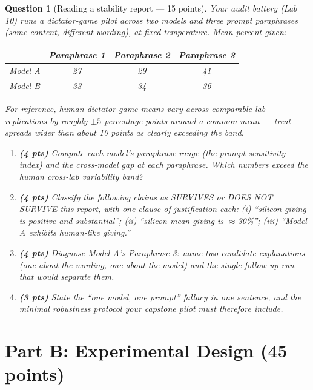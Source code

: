 \documentclass[11pt]{article}
\newtheorem{question}{Question}
\begin{document}
\begin{question}[Reading a stability report --- 15 points]
Your audit battery (Lab 10) runs a dictator-game pilot across two
models and three prompt paraphrases (same content, different wording),
at fixed temperature. Mean percent given:

\begin{center}
\begin{tabular}{@{}lccc@{}}
\toprule
 & Paraphrase 1 & Paraphrase 2 & Paraphrase 3 \\
\midrule
Model A & 27 & 29 & 41 \\
Model B & 33 & 34 & 36 \\
\bottomrule
\end{tabular}
\end{center}

For reference, human dictator-game means vary across comparable lab
replications by roughly $\pm 5$ percentage points around a common mean
--- treat spreads wider than about 10 points as clearly exceeding the
band.

\begin{enumerate}[label=(\alph*)]
  \item \textbf{(4 pts)} Compute each model's paraphrase range (the
        prompt-sensitivity index) and the cross-model gap at each
        paraphrase. Which numbers exceed the human cross-lab
        variability band?
  \item \textbf{(4 pts)} Classify the following claims as SURVIVES or
        DOES NOT SURVIVE this report, with one clause of
        justification each: (i) ``silicon giving is positive and
        substantial''; (ii) ``silicon mean giving is $\approx$30\%'';
        (iii) ``Model A exhibits human-like giving.''
  \item \textbf{(4 pts)} Diagnose Model A's Paraphrase 3: name two
        candidate explanations (one about the wording, one about the
        model) and the single follow-up run that would separate them.
  \item \textbf{(3 pts)} State the ``one model, one prompt'' fallacy
        in one sentence, and the minimal robustness protocol your
        capstone pilot must therefore include.
\end{enumerate}
\end{question}

\section*{Part B: Experimental Design (45 points)}
\end{document}
